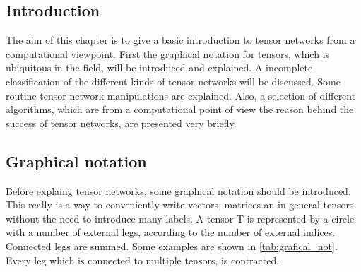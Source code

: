\subsection{Introduction}

The aim of this chapter is to give a basic introduction to tensor networks from a computational viewpoint. First the graphical notation for tensors, which is ubiquitous in the field, will be introduced and explained. A incomplete classification of the different kinds of tensor networks will be discussed. Some routine tensor network manipulations are explained. Also, a selection of different algorithms, which are from a computational point of view the reason behind the success of tensor networks, are presented very briefly.

\subsection{Graphical notation}

Before explaing tensor networks, some graphical notation should be introduced. This really is a way to conveniently write vectors, matrices an in general tensors without the need to introduce many labels. A tensor T is represented by a circle with a number of external legs, according to the number of external indices. Connected legs are summed. Some examples are shown in \cref{tab:grafical_not}. Every leg which is connected to multiple tensors, is contracted.

